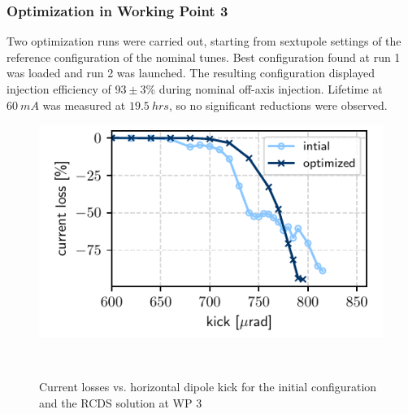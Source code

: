 \subsubsection{Optimization in Working Point 3}
Two optimization runs were carried out, starting from sextupole settings of the reference configuration of the nominal tunes. Best configuration found at run 1 was loaded and run 2 was launched. The resulting configuration displayed injection efficiency of $93\pm3\%$ during nominal off-axis injection. Lifetime at $60~\unit{mA}$ was measured at $19.5~\unit{hrs}$, so no significant reductions were observed.

\begin{figure}[htb]
    \begin{minipage}{0.48\textwidth}
        \centering
        \includegraphics[width=\textwidth]{Images/wp3_kick_resilience.pdf}
        \caption{Current losses vs. horizontal dipole kick for the initial configuration and the RCDS solution at WP 3}
    \end{minipage}\
    \hfill
    \begin{minipage}{0.48\textwidth}
        \centering

\end{minipage}
\end{figure}
